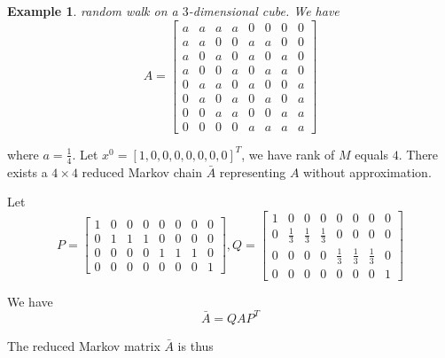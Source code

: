 \documentclass{article}
\newtheorem{example}{Example}
\begin{document}
\begin{example}
random walk on a $3$-dimensional cube. We have
\begin{equation}
A = 
\left[  \begin{array}{cccccccc}
        a & a & a & a & 0 & 0 & 0 & 0 \\ 
        a & a & 0 & 0 & a & a & 0 & 0 \\
        a & 0 & a & 0 & a & 0 & a & 0 \\
        a & 0 & 0 & a & 0 & a & a & 0 \\
        0 & a & a & 0 & a & 0 & 0 & a \\
        0 & a & 0 & a & 0 & a & 0 & a \\
        0 & 0 & a & a & 0 & 0 & a & a \\
        0 & 0 & 0 & 0 & a & a & a & a         
		\end{array} \right]
\end{equation}
\end{example}
where $a=\frac{1}{4}$.
Let $x^0=[1,0,0,0,0,0,0,0]^T$, we have rank of $M$ equals $4$. There exists a $4 \times 4$ reduced Markov chain $\bar{A}$ representing $A$ without approximation.  


Let 
\begin{equation}
P = 
\left[  \begin{array}{cccccccc}
        1 & 0 & 0 & 0 & 0 & 0 & 0 & 0 \\ 
        0 & 1 & 1 & 1 & 0 & 0 & 0 & 0 \\
        0 & 0 & 0 & 0 & 1 & 1 & 1 & 0 \\
        0 & 0 & 0 & 0 & 0 & 0 & 0 & 1 
		\end{array} \right],
Q = 
\left[  \begin{array}{cccccccc}
        1 & 0 & 0 & 0 & 0 & 0 & 0 & 0 \\ 
        0 & \frac{1}{3} & \frac{1}{3} & \frac{1}{3} & 0 & 0 & 0 & 0 \\
        0 & 0 & 0 & 0 & \frac{1}{3} & \frac{1}{3} & \frac{1}{3} & 0 \\
        0 & 0 & 0 & 0 & 0 & 0 & 0 & 1 
		\end{array} \right]
\end{equation}


We have
\begin{equation}
 \bar{A} = Q A P^T
\end{equation}

The reduced Markov matrix $\bar{A}$ is thus
\end{document}
